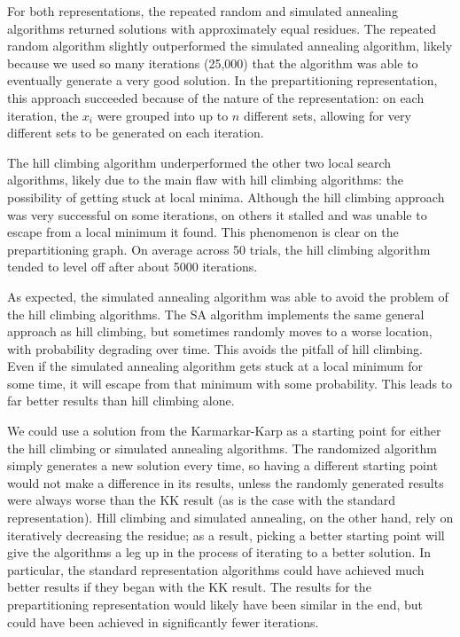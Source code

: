 \documentclass[solution, letterpaper]{cs121}
\begin{document}
For both representations, the repeated random and simulated annealing algorithms returned solutions with approximately equal residues. The repeated random algorithm slightly outperformed the simulated annealing algorithm, likely because we used so many iterations (25,000) that the algorithm was able to eventually generate a very good solution. In the prepartitioning representation, this approach succeeded because of the nature of the representation: on each iteration, the $x_i$ were grouped into up to $n$ different sets, allowing for very different sets to be generated on each iteration. 

The hill climbing algorithm underperformed the other two local search algorithms, likely due to the main flaw with hill climbing algorithms: the possibility of getting stuck at local minima. Although the hill climbing approach was very successful on some iterations, on others it stalled and was unable to escape from a local minimum it found. This phenomenon is clear on the prepartitioning graph. On average across 50 trials, the hill climbing algorithm tended to level off after about 5000 iterations. 

As expected, the simulated annealing algorithm was able to avoid the problem of the hill climbing algorithms. The SA algorithm implements the same general approach as hill climbing, but sometimes randomly moves to a worse location, with probability degrading over time. This avoids the pitfall of hill climbing. Even if the simulated annealing algorithm gets stuck at a local minimum for some time, it will escape from that minimum with some probability. This leads to far better results than hill climbing alone.

We could use a solution from the Karmarkar-Karp as a starting point for either the hill climbing or simulated annealing algorithms. The randomized algorithm simply generates a new solution every time, so having a different starting point would not make a difference in its results, unless the randomly generated results were always worse than the KK result (as is the case with the standard representation). Hill climbing and simulated annealing, on the other hand, rely on iteratively decreasing the residue; as a result, picking a better starting point will give the algorithms a leg up in the process of iterating to a better solution. In particular, the standard representation algorithms could have achieved much better results if they began with the KK result. The results for the prepartitioning representation would likely have been similar in the end, but could have been achieved in significantly fewer iterations.
\end{document}
